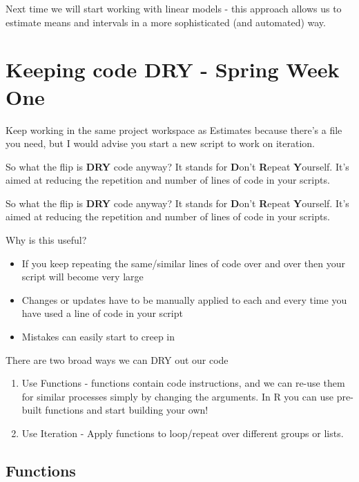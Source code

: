 \documentclass[
]{book}
\begin{document}
Next time we will start working with linear models - this approach allows us to estimate means and intervals in a more sophisticated (and automated) way.

\hypertarget{keeping-code-dry---spring-week-one}{%
\chapter{Keeping code DRY - Spring Week One}\label{keeping-code-dry---spring-week-one}}

Keep working in the same project workspace as Estimates because there's a file you need, but I would advise you start a new script to work on iteration.

So what the flip is \textbf{DRY} code anyway? It stands for \textbf{D}on't \textbf{R}epeat \textbf{Y}ourself. It's aimed at reducing the repetition and number of lines of code in your scripts.

So what the flip is \textbf{DRY} code anyway? It stands for \textbf{D}on't \textbf{R}epeat \textbf{Y}ourself. It's aimed at reducing the repetition and number of lines of code in your scripts.

Why is this useful?

\begin{itemize}
\item
  If you keep repeating the same/similar lines of code over and over then your script will become very large
\item
  Changes or updates have to be manually applied to each and every time you have used a line of code in your script
\item
  Mistakes can easily start to creep in
\end{itemize}

There are two broad ways we can DRY out our code

\begin{enumerate}
\def\labelenumi{\arabic{enumi})}
\item
  Use Functions - functions contain code instructions, and we can re-use them for similar processes simply by changing the arguments. In R you can use pre-built functions and start building your own!
\item
  Use Iteration - Apply functions to loop/repeat over different groups or lists.
\end{enumerate}

\hypertarget{functions-1}{%
\section{Functions}\label{functions-1}}
\end{document}
